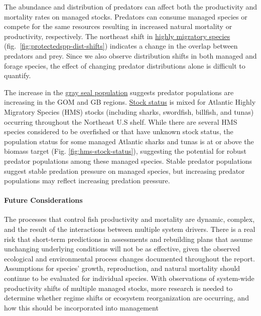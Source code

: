 \documentclass[
  10pt,
]{article}
\begin{document}
The abundance and distribution of predators can affect both the productivity and mortality rates on managed stocks. Predators can consume managed species or compete for the same resources resulting in increased natural mortality or productivity, respectively. The northeast shift in \href{https://noaa-edab.github.io/catalog/cetacean-distribution-shifts.html}{highly migratory species} (fig.~\ref{fig:protectedspp-dist-shifts}) indicates a change in the overlap between predators and prey. Since we also observe distribution shifts in both managed and forage species, the effect of changing predator distributions alone is difficult to quantify.

The increase in the \href{https://noaa-edab.github.io/catalog/gray-seal-bycatch.html}{gray seal population} suggests predator populations are increasing in the GOM and GB regions. \href{https://noaa-edab.github.io/catalog/highly-migratory-species-stock-status.html}{Stock status} is mixed for Atlantic Highly Migratory Species (HMS) stocks (including sharks, swordfish, billfish, and tunas) occurring throughout the Northeast U.S shelf. While there are several HMS species considered to be overfished or that have unknown stock status, the population status for some managed Atlantic sharks and tunas is at or above the biomass target (Fig. \ref{fig:hms-stock-status}), suggesting the potential for robust predator populations among these managed species. Stable predator populations suggest stable predation pressure on managed species, but increasing predator populations may reflect increasing predation pressure.

\hypertarget{future-considerations-2}{%
\paragraph{Future Considerations}\label{future-considerations-2}}

The processes that control fish productivity and mortality are dynamic, complex, and the result of the interactions between multiple system drivers. There is a real risk that short-term predictions in assessments and rebuilding plans that assume unchanging underlying conditions will not be as effective, given the observed ecological and environmental process changes documented throughout the report. Assumptions for species' growth, reproduction, and natural mortality should continue to be evaluated for individual species. With observations of system-wide productivity shifts of multiple managed stocks, more research is needed to determine whether regime shifts or ecosystem reorganization are occurring, and how this should be incorporated into management
\end{document}
